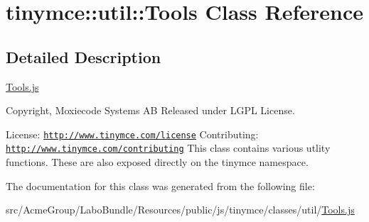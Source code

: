 \hypertarget{classtinymce_1_1util_1_1_tools}{\section{tinymce\+:\+:util\+:\+:Tools Class Reference}
\label{classtinymce_1_1util_1_1_tools}
}


\subsection{Detailed Description}
\hyperlink{_tools_8js}{Tools.\+js}

Copyright, Moxiecode Systems A\+B Released under L\+G\+P\+L License.

License\+: \href{http://www.tinymce.com/license}{\tt http\+://www.\+tinymce.\+com/license} Contributing\+: \href{http://www.tinymce.com/contributing}{\tt http\+://www.\+tinymce.\+com/contributing} This class contains various utlity functions. These are also exposed directly on the tinymce namespace. 

The documentation for this class was generated from the following file\+:\begin{DoxyCompactItemize}
\item 
src/\+Acme\+Group/\+Labo\+Bundle/\+Resources/public/js/tinymce/classes/util/\hyperlink{_tools_8js}{Tools.\+js}\end{DoxyCompactItemize}
